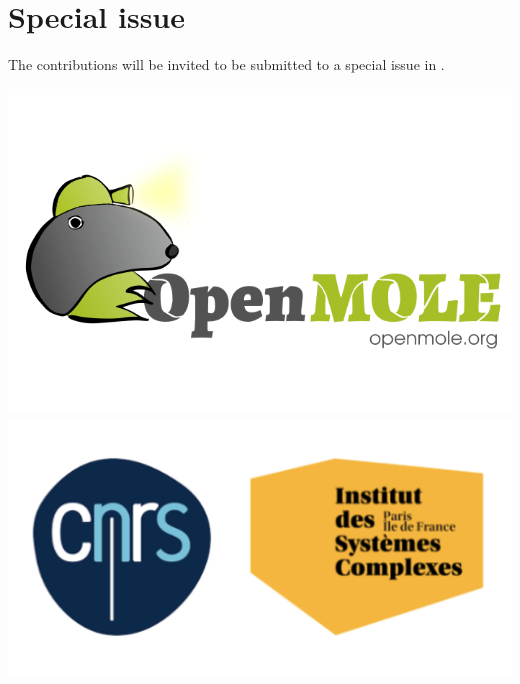 \documentclass[11pt]{article}
\begin{document}
\section*{Special issue}

The contributions will be invited to be submitted to a special issue in .


\vspace{1cm}

\centering
\includegraphics[width=0.3\linewidth]{openmole}\hspace{0.5cm}
\includegraphics[width=0.3\linewidth]{isc}


\end{document}
